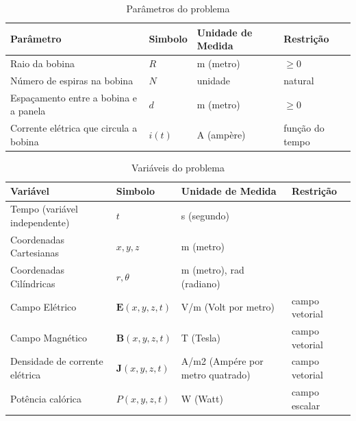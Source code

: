 \documentclass[
	article,			%
	11pt,				%
	oneside,			%
	a4paper,			%
	english,			%
	brazil,				%
	sumario=tradicional
	]{abntex2}
\begin{document}
\begin{table}[h]
	\begin{tabular}{@{}llll@{}}
		\toprule
		\textbf{Parâmetro}                     & \textbf{Simbolo} & \textbf{Unidade de Medida} & \textbf{Restrição} \\ \midrule
		Raio da bobina                         & $ R $            & m (metro)                  & $ \ge 0 $          \\
		Número de espiras na bobina            & $ N $            & unidade                    & natural            \\
		Espaçamento entre a bobina e a panela  & $ d $            & m (metro)                  & $ \ge 0 $          \\
		Corrente elétrica que circula a bobina & $ i(t) $         & A (ampère)                 & função do tempo    \\ \bottomrule
	\end{tabular}
	\caption{Parâmetros do problema}
	\label{tab:parametros}
\end{table}

\begin{table}[h]
	\begin{tabular}{@{}llll@{}}
		\toprule
		\textbf{Variável}             & \textbf{Simbolo}            & \textbf{Unidade de Medida}        & \textbf{Restrição}     \\ \midrule
		Tempo (variável independente)  & $ t $                      & s (segundo)                       &                \\ 
		Coordenadas Cartesianas        & $ x, y, z $                & m (metro)                         &                \\ 
		Coordenadas Cilíndricas        & $ r, \theta $              & m (metro), rad (radiano)          &                \\ 
		Campo Elétrico                 & $ \textbf{E}(x, y, z, t) $ & V/m (Volt por metro)              & campo vetorial \\ 
		Campo Magnético                & $ \textbf{B}(x, y, z, t) $ & T (Tesla)                         & campo vetorial \\
		Densidade de corrente elétrica & $ \textbf{J}(x, y, z, t) $ & A/m2 (Ampére por metro quatrado)  & campo vetorial \\
		Potência calórica              & $ P(x, y, z, t) $          & W (Watt)                          & campo escalar  \\ \bottomrule
	\end{tabular}
	\caption{Variáveis do problema}
	\label{tab:variaveis}
\end{table}
\end{document}
